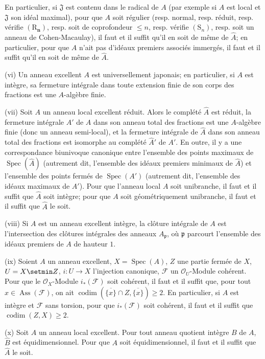 \begin{scholium}[7.8.3]
En particulier, si $\mathfrak J$ est contenu dans le radical de $A$ \textup{(par
exemple si $A$ est local et $\mathfrak J$ son idéal maximal)}, pour que $A$ soit
régulier \textup{(resp.} normal, \textup{resp.} réduit, \textup{resp.} vérifie $(\mathrm R_{\boldsymbol n})$, \textup{resp.} soit
de coprofondeur $\leq n$, \textup{resp.} vérifie $(\mathrm S_n)$, \textup{resp.} soit un anneau
de Cohen-Macaulay), il faut et il suffit qu'il en soit de même de $\widehat A$;
en particulier, pour que $A$ n'ait pas d'idéaux premiers associés immergés, il
faut et il suffit qu'il en soit de même de $\widehat A$.

\textup{(vi)} Un anneau excellent $A$ est universellement japonais; en particulier, si
$A$ est intègre, sa fermeture intégrale dans toute extension finie de son corps
des fractions est une $A$-algèbre finie.

\textup{(vii)} Soit $A$ un anneau \textup{local} excellent réduit. Alors le complété $\widehat A$
est réduit, la fermeture intégrale $A'$ de $A$ dans son anneau total des
fractions est une $A$-algèbre finie \textup{(donc un anneau} semi-local), et la fermeture
intégrale de $\widehat A$ dans son anneau total des fractions est isomorphe au
complété $\widehat{A}'$ de $A'$. En outre, il y a une correspondance biunivoque
canonique entre l'ensemble des points maximaux de
$\operatorname{Spec}(\widehat A)$ \textup{(autrement dit, l'ensemble des idéaux premiers}
minimaux \textup{de $\widehat A$)} et l'ensemble des points fermés de
$\operatorname{Spec}(A')$ \textup{(autrement dit, l'ensemble des idéaux} maximaux \textup{de
$A'$)}. Pour que l'anneau local $A$ soit unibranche, il faut et il suffit que
$\widehat A$ soit intègre; pour que $A$ soit géométriquement unibranche, il faut
et il suffit que $\widehat A$ le soit.

\textup{(viii)} Si $A$ est un anneau excellent intègre, la clôture intégrale de $A$ est
l'intersection des clôtures intégrales des anneaux $A_{\mathfrak p}$, où
$\mathfrak p$ parcourt l'ensemble des idéaux premiers de $A$ de hauteur $1$.

\textup{(ix)} Soient $A$ un anneau excellent, $X=\operatorname{Spec}(A)$, $Z$ une partie
fermée de $X$, $U=X\setmin Z$, $i:U\to X$ l'injection canonique, $\mathcal F$ un
$\mathcal O_U$-Module cohérent. Pour que le $\mathcal O_X$-Module
$i_*(\mathcal F)$ soit cohérent, il faut et il suffit que, pour tout
$x\in\operatorname{Ass}(\mathcal F)$, on ait
$\operatorname{codim}(\overline{\{x\}}\cap Z,\overline{\{x\}})\geq2$. En
particulier, si $A$ est intègre et $\mathcal F$ sans torsion, pour que
$i_*(\mathcal F)$ soit cohérent, il faut et il suffit que
$\operatorname{codim}(Z,X)\geq2$.


\textup{(x)} Soit $A$ un anneau local excellent. Pour tout anneau quotient intègre $B$
de $A$, $\widehat B$ est équidimensionnel. Pour que $A$ soit équidimensionnel,
il faut et il suffit que $\widehat A$ le soit.
\end{scholium}


